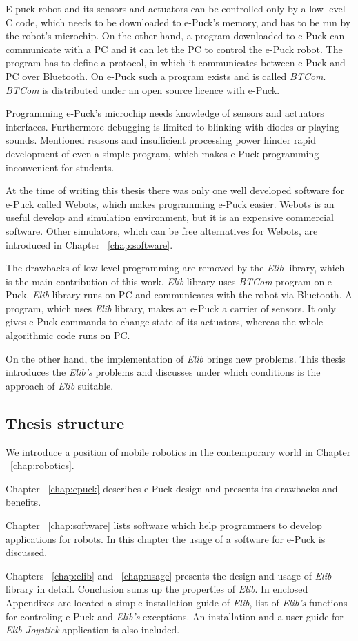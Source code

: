	 E-puck robot and its sensors and actuators can be controlled only by a low level C code,
	  which needs to be downloaded to e-Puck's memory, and has to be run by the robot's microchip.
	 On the other hand, a program downloaded to e-Puck can communicate with
	 a PC and it can let the PC to control the e-Puck robot. 
	 The program has to define a protocol, in which it communicates between e-Puck and PC over Bluetooth.
	On e-Puck such a program exists and is called {\it BTCom}. 
	{\it BTCom} is distributed under an open source licence with e-Puck.

	Programming e-Puck's microchip needs knowledge of sensors and actuators interfaces.
	Furthermore debugging is limited to blinking with diodes or playing sounds.
	Mentioned reasons and insufficient processing power hinder rapid development of even a simple program, 
	which makes e-Puck programming inconvenient for students.
	
	At the time of writing this thesis there was only one well developed software for e-Puck called Webots,
	which makes programming e-Puck easier.
	Webots is an useful develop and simulation environment, but it is an expensive commercial software.
	Other simulators, which can be free alternatives for Webots, are introduced in Chapter ~\ref{chap:software}.
	
	The drawbacks of low level programming are removed by the {\it Elib} library, which is the main 
	contribution of this work.
        {\it Elib} library uses {\it BTCom} program on e-Puck.
	{\it Elib} library runs on PC and communicates with the robot via Bluetooth. 
	A program, which uses {\it Elib} library,	makes an e-Puck a carrier of sensors. It only gives e-Puck 	
	commands to change state of its actuators, whereas the whole algorithmic code runs on PC.
	
	On the other hand, the implementation of {\it Elib} brings new problems.
	This thesis introduces the {\it Elib's} problems and discusses 
	under which conditions is the approach of {\it Elib} suitable.	
	\subsection*{Thesis structure}
	We introduce a position of mobile robotics in the contemporary world in Chapter ~\ref{chap:robotics}.

	Chapter ~\ref{chap:epuck} describes e-Puck design and presents its drawbacks and benefits.

	Chapter ~\ref{chap:software} lists software which help programmers to develop applications for robots.
	In this chapter the usage of a software for e-Puck is discussed. 
	
	Chapters ~\ref{chap:elib} and ~\ref{chap:usage} presents the design and usage of {\it Elib} library in detail.
	Conclusion sums up the properties of {\it Elib}.
	In enclosed Appendixes are located a simple installation guide of {\it Elib}, list of {\it Elib's} functions 
	for controling e-Puck and {\it Elib's} exceptions. 
	An installation and a user guide for {\it Elib Joystick} application is also included. 


